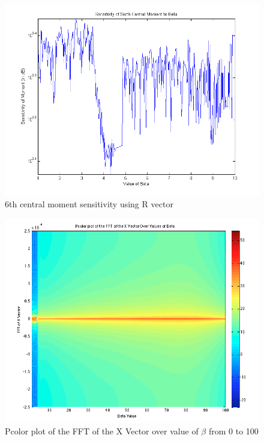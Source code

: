 \documentclass{article}[11pt]
\begin{document}
\begin{figure}[H]
\centering
\includegraphics[scale = 0.6]{RSensitivitySixth.png}
\caption{6th central moment sensitivity using R vector}
\label{fig:6thR}
\end{figure}
\begin{figure}[H]
\centering
\includegraphics[totalheight=0.4\textheight]{pcolor1.png}
\caption{Pcolor plot of the FFT of the X Vector over value of $\beta$ from 0 to 100}
\label{fig:pcolor1}
\end{figure}
\end{document}
